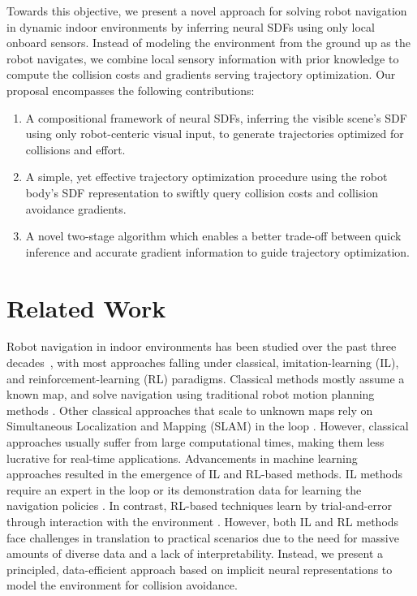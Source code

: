 \documentclass[letterpaper, 10 pt, conference]{ieeeconf}  %
\begin{document}
Towards this objective, we present a novel approach for solving robot navigation in dynamic indoor environments by inferring neural SDFs using only local onboard sensors.
Instead of modeling the environment from the ground up as the robot navigates, we combine local sensory information with prior knowledge to compute the collision costs and gradients serving trajectory optimization.
Our proposal encompasses the following contributions:
\begin{enumerate}
    \item A compositional framework of neural SDFs, inferring the visible scene's SDF using only robot-centeric visual input, to generate trajectories optimized for collisions and effort.
    \item A simple, yet effective trajectory optimization procedure using the robot body's SDF representation to swiftly query collision costs and collision avoidance gradients.
    \item A novel two-stage algorithm which enables a better trade-off between quick inference and accurate gradient information to guide trajectory optimization.
\end{enumerate}

\section{Related Work}

Robot navigation in indoor environments has been studied over the past three decades~\cite{desouza2002vision, cox1991blanche}, with most approaches falling under classical, imitation-learning (IL), and reinforcement-learning (RL) paradigms.
Classical methods mostly assume a known map, and solve navigation using traditional robot motion planning methods \cite{burgard1999experiences, thrun1999minerva, karaman2011sampling}.
Other classical approaches that scale to unknown maps rely on Simultaneous Localization and Mapping (SLAM) in the loop \cite{jones2011visual, chaplot2020learning, zhan2022activermap}.
However, classical approaches usually suffer from large computational times, making them less lucrative for real-time applications.
Advancements in machine learning approaches resulted in the emergence of IL and RL-based methods. 
IL methods require an expert in the loop or its demonstration data for learning the navigation policies \cite{gupta2017cognitive, finn2017one, stepputtis2020language}.
In contrast, RL-based techniques learn by trial-and-error through interaction with the environment \cite{zhu2017target, mirowski2016learning, ye2021auxiliary}.
However, both IL and RL methods face challenges in translation to practical scenarios due to the need for massive amounts of diverse data and a lack of interpretability.
Instead, we present a principled, data-efficient approach based on implicit neural representations to model the environment for collision avoidance.
\end{document}
